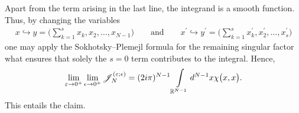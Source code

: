 \documentclass[11pt]{article}
\numberwithin{equation}{section}
\numberwithin{equation}{section}
\begin{document}
Apart from the term arising in the last line, the integrand is a smooth function. Thus, by changing the variables
\begin{gather*}
x\hookrightarrow y=\bigg( \sum_{k=1}^{s}x_k ,x_2,\dots, x_{N-1} \bigg) \qquad \text{and} \qquad
x^{\prime}\hookrightarrow y^{\prime}=\bigg( \sum_{k=1}^{s} x_k^{\prime},x_2^{\prime},\dots, x_{s}^{\prime} \bigg)
\end{gather*}
one may apply the Sokhotsky--Plemejl formula for the remaining singular factor what ensures that solely the $s=0$ term contributes to the
integral. Hence,{\samepage
\begin{gather*}
 \lim_{\varepsilon\rightarrow 0^+} \lim_{\epsilon \rightarrow 0^+ } \mathscr{J}_N^{(\varepsilon;\epsilon)} = (2 {\rm i}\pi)^{N-1}
 \int\limits_{\mathbb{R}^{N-1}}{} {\rm d}^{N-1}x \chi\big( x, x\big) .
\end{gather*}
This entails the claim.}
\end{document}

